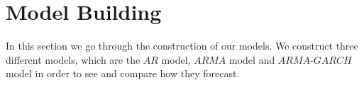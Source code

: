 











\section{Model Building}
In this section we go through the construction of our models. We construct three different models, which are the $AR$ model, $ARMA$ model and $ARMA$-$GARCH$ model in order to see and compare how they forecast.



